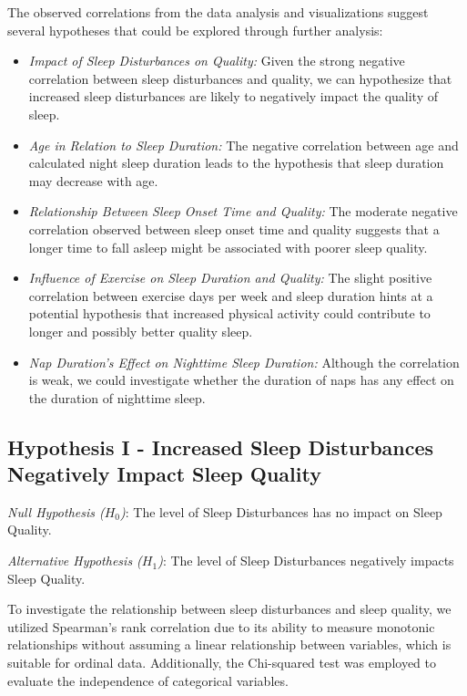 \documentclass[conference]{IEEEtran}
\begin{document}
The observed correlations from the data analysis and visualizations suggest several hypotheses that could be explored through further analysis:
      \begin{itemize}

        \item \textit{Impact of Sleep Disturbances on Quality:} Given the strong negative correlation between sleep disturbances and quality, we can hypothesize that increased sleep disturbances are likely to negatively impact the quality of sleep.

        \item \textit{Age in Relation to Sleep Duration:} The negative correlation between age and calculated night sleep duration leads to the hypothesis that sleep duration may decrease with age.
        
        \item \textit{Relationship Between Sleep Onset Time and Quality:} The moderate negative correlation observed between sleep onset time and quality suggests that a longer time to fall asleep might be associated with poorer sleep quality.
        
        \item \textit{Influence of Exercise on Sleep Duration and Quality:} The slight positive correlation between exercise days per week and sleep duration hints at a potential hypothesis that increased physical activity could contribute to longer and possibly better quality sleep.
        
        \item \textit{Nap Duration's Effect on Nighttime Sleep Duration:} Although the correlation is weak, we could investigate whether the duration of naps has any effect on the duration of nighttime sleep.
      \end{itemize}
      \subsection*{Hypothesis I - Increased Sleep Disturbances Negatively Impact Sleep Quality}
      \textit{Null Hypothesis (\(H_0\))}: The level of Sleep Disturbances has no impact on Sleep Quality.
      
      \textit{Alternative Hypothesis (\(H_1\))}: The level of Sleep Disturbances negatively impacts Sleep Quality.
      
      To investigate the relationship between sleep disturbances and sleep quality, we utilized Spearman's rank correlation due to its ability to measure monotonic relationships without assuming a linear relationship between variables, which is suitable for ordinal data. Additionally, the Chi-squared test was employed to evaluate the independence of categorical variables.
      
\end{document}
